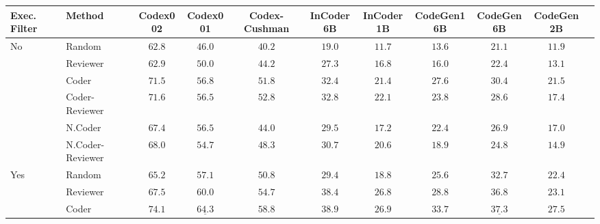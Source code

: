 \documentclass[nohyperref]{article}
\theoremstyle{plain}
\theoremstyle{definition}
\theoremstyle{remark}
\begin{document}
\begin{table*}[]
\setlength{\tabcolsep}{1.5pt}
\footnotesize
\centering
\begin{tabular}{l|lccccccccc}
\toprule
    Exec. Filter & Method &            Codex002 &            Codex001 &       Codex-Cushman &           InCoder6B &           InCoder1B &          CodeGen16B &           CodeGen6B &           CodeGen2B \\
\midrule
\multirow{6}{*}{No} & Random &              $62.8$ &              $46.0$ &              $40.2$ &              $19.0$ &              $11.7$ &              $13.6$ &              $21.1$ &              $11.9$ \\
    & Reviewer &              $62.9$ &              $50.0$ &              $44.2$ &              $27.3$ &              $16.8$ &              $16.0$ &              $22.4$ &              $13.1$ \\
\cmidrule{2-10}
    & Coder &              $71.5$ &              $56.8$ &              $51.8$ &              $32.4$ &              $21.4$ &              $27.6$ &              $30.4$ &              $21.5$ \\
    & Coder-Reviewer &              $71.6$ &              $56.5$ &              $52.8$ &              $32.8$ &              $22.1$ &              $23.8$ &              $28.6$ &              $17.4$ \\
\cmidrule{2-10}
    & N.Coder &              $67.4$ &              $56.5$ &              $44.0$ &              $29.5$ &              $17.2$ &              $22.4$ &              $26.9$ &              $17.0$ \\
    & N.Coder-Reviewer &              $68.0$ &              $54.7$ &              $48.3$ &              $30.7$ &              $20.6$ &              $18.9$ &              $24.8$ &              $14.9$ \\
\midrule
\multirow{7}{*}{Yes} & Random &              $65.2$ &              $57.1$ &              $50.8$ &              $29.4$ &              $18.8$ &              $25.6$ &              $32.7$ &              $22.4$ \\
    & Reviewer &              $67.5$ &              $60.0$ &              $54.7$ &              $38.4$ &              $26.8$ &              $28.8$ &              $36.8$ &              $23.1$ \\
\cmidrule{2-10}
    & Coder &              $74.1$ &  $\underline{64.3}$ &              $58.8$ &              $38.9$ &              $26.9$ &     $\mathbf{33.7}$ &  $\underline{37.3}$ &     $\mathbf{27.5}$ \\

\end{tabular}
\end{table*}
\end{document}
